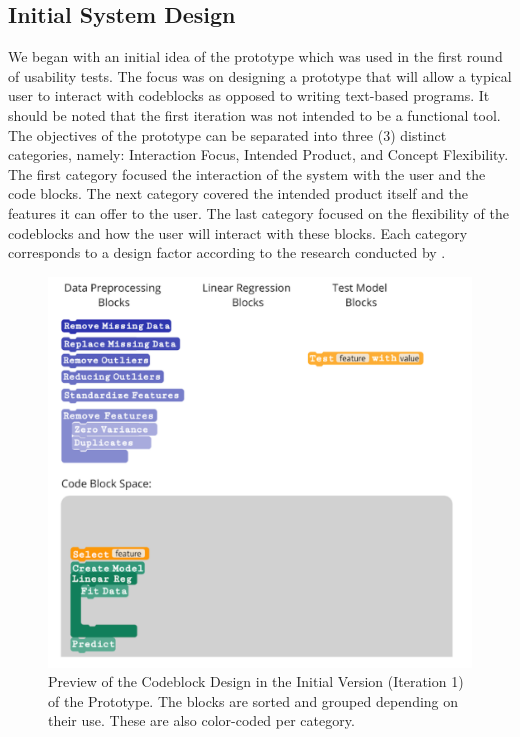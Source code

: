 \documentclass{sigchi}
\begin{document}
\subsection{Initial System Design}
We began with an initial idea of the prototype which was used in the first round of usability tests. The focus was on designing a prototype that will allow a typical user to interact with codeblocks as opposed to writing text-based programs. It should be noted that the first iteration was not intended to be a functional tool. The objectives of the prototype can be separated into three (3) distinct categories, namely: Interaction Focus, Intended Product, and Concept Flexibility. The first category focused the interaction of the system with the user and the code blocks. The next category covered the intended product itself and the features it can offer to the user. The last category focused on the flexibility of the codeblocks and how the user will interact with these blocks. Each category corresponds to a design factor according to the research conducted by .
\begin{figure}[t]
    \centering
    \includegraphics[width = 1 \columnwidth]{figures/IT1_full}
    \caption{Preview of the Codeblock Design in the Initial Version (Iteration 1) of the Prototype. The blocks are sorted and grouped depending on their use. These are also color-coded per category. }
    \label{fig:it1}
\end{figure}
\end{document}
